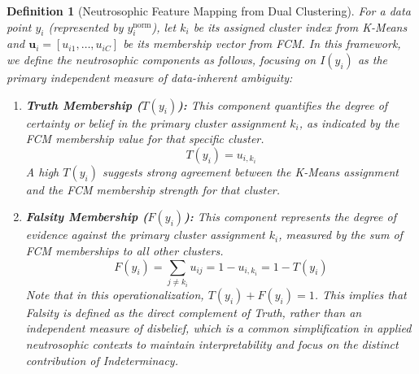 \documentclass[review,3p,times]{elsarticle}
\newtheorem{definition}{Definition}[section]
\begin{document}
\begin{definition}[Neutrosophic Feature Mapping from Dual Clustering]
\label{def:revised_neu_trans}
For a data point $y_i$ (represented by $y_i^{\text{norm}}$), let $k_i$ be its assigned cluster index from K-Means and $\mathbf{u}_i = [u_{i1}, \dots, u_{iC}]$ be its membership vector from FCM. In this framework, we define the neutrosophic components as follows, focusing on $I(y_i)$ as the primary independent measure of data-inherent ambiguity:

\begin{enumerate}
    \item \textbf{Truth Membership ($T(y_i)$):} This component quantifies the degree of certainty or belief in the primary cluster assignment $k_i$, as indicated by the FCM membership value for that specific cluster.
    \begin{equation}
        T(y_i) = u_{i, k_i}
    \end{equation}
    A high $T(y_i)$ suggests strong agreement between the K-Means assignment and the FCM membership strength for that cluster.

    \item \textbf{Falsity Membership ($F(y_i)$):} This component represents the degree of evidence against the primary cluster assignment $k_i$, measured by the sum of FCM memberships to all other clusters.
    \begin{equation}
        F(y_i) = \sum_{j \neq k_i} u_{ij} = 1 - u_{i, k_i} = 1 - T(y_i)
    \end{equation}
    Note that in this operationalization, $T(y_i) + F(y_i) = 1$. This implies that Falsity is defined as the direct complement of Truth, rather than an independent measure of disbelief, which is a common simplification in applied neutrosophic contexts to maintain interpretability and focus on the distinct contribution of Indeterminacy.


\end{enumerate}
\end{definition}
\end{document}
